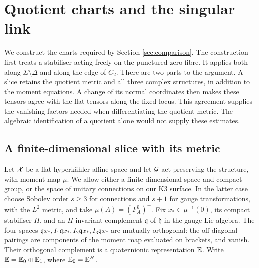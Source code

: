 \section{Quotient charts and the singular link}\label{sec:slices}

We construct the charts required by Section \ref{sec:comparison}.
The construction first treats a stabiliser acting freely on the
punctured zero fibre. It applies both along
$\Sigma\setminus\Delta$ and along the edge of $C_2$.
There are two parts to the argument. A slice retains the quotient
metric and all three complex structures, in addition to the moment
equations. A change of its normal coordinates then makes these
tensors agree with the flat tensors along the fixed locus. This
agreement supplies the vanishing factors needed when differentiating
the quotient metric. The algebraic identification of a quotient
alone would not supply these estimates.

\subsection{A finite-dimensional slice with its metric}
Let $\mathcal X$ be a flat hyperk\"ahler affine space and let $\mathcal G$ act
preserving the structure, with moment map $\mu$. We allow either
a finite-dimensional space and compact group, or the space of
unitary connections on our K3 surface. In the latter case choose
Sobolev order $s\ge3$ for connections and $s+1$ for gauge
transformations, with the $L^2$ metric, and take
$\mu(A)=(F_A^0)^+$. Fix $x_*\in\mu^{-1}(0)$, its compact
stabiliser $H$, and an $H$-invariant complement $\mathfrak q$ of
$\mathfrak h$ in the gauge Lie algebra. The four spaces
$\mathfrak qx_*,I_1\mathfrak qx_*,I_2\mathfrak qx_*,I_3\mathfrak qx_*$
are mutually orthogonal: the off-diagonal pairings are components
of the moment map evaluated on brackets, and vanish. Their
orthogonal complement is a quaternionic representation $\mathbb E$.
Write $\mathbb E=\mathbb E_0\oplus\mathbb E_1$, where $\mathbb E_0=\mathbb E^H$.

